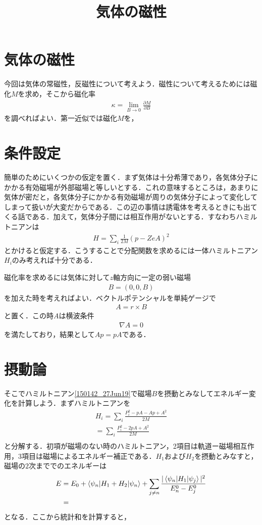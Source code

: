 \documentclass[a4j]{jarticle}
\title{気体の磁性}
\begin{document}
\section{気体の磁性}
今回は気体の常磁性，反磁性について考えよう．磁性について考えるためには磁化$M$を求め，そこから磁化率
\begin{align*}
 \kappa =\lim_{B\to 0}\frac{\partial M}{\partial B}
\end{align*}
を調べればよい．第一近似では磁化$M$を，

\section{条件設定}
簡単のためにいくつかの仮定を置く．まず気体は十分希薄であり，各気体分子にかかる有効磁場が外部磁場と等しいとする．これの意味するところは，あまりに気体が密だと，各気体分子にかかる有効磁場が周りの気体分子によって変化してしまって扱いが大変だからである．この辺の事情は誘電体を考えるときにも出てくる話である．加えて，気体分子間には相互作用がないとする．すなわちハミルトニアンは
\begin{align}
 H=\sum_{i}\frac{1}{2M}\left(p-ZeA\right)^2\label{150142_27Jun19}
\end{align}
とかけると仮定する．こうすることで分配関数を求めるには一体ハミルトニアン$H_i$のみ考えれば十分である．


磁化率を求めるには気体に対して$z$軸方向に一定の弱い磁場
\begin{align*}
 B=(0,0,B)
\end{align*}
を加えた時を考えればよい．ベクトルポテンシャルを単純ゲージで
\begin{align*}
 A=r\times B
\end{align*}
と置く．この時$A$は横波条件
\begin{align*}
 \nabla A =0
\end{align*}
を満たしており，結果として$Ap=pA$である．

\section{摂動論}
そこでハミルトニアン\ref{150142_27Jun19}で磁場$B$を摂動とみなしてエネルギー変化を計算しよう．まずハミルトニアンを
\begin{align*}
 H_i=\sum_{i}\frac{P^2_i-pA-Ap+A^2}{2M} \\
=\sum_{i}\frac{P^2_i-2pA+A^2}{2M} \\
\end{align*}
と分解する．初項が磁場のない時のハミルトニアン，2項目は軌道ー磁場相互作用，3項目は磁場によるエネルギー補正である．$H_1$および$H_2$を摂動とみなすと，磁場の$2$次まででのエネルギーは
\begin{align*}
 E&=E_0+\braket{\psi_n|H_1+H_2|\psi_n}+\sum_{j\neq n}\frac{|\braket{\psi_n | H_1 |\psi_j}|^2}{E_n^0-E_j^0} \\
&=
\end{align*}
となる．ここから統計和を計算すると，
\end{document}

